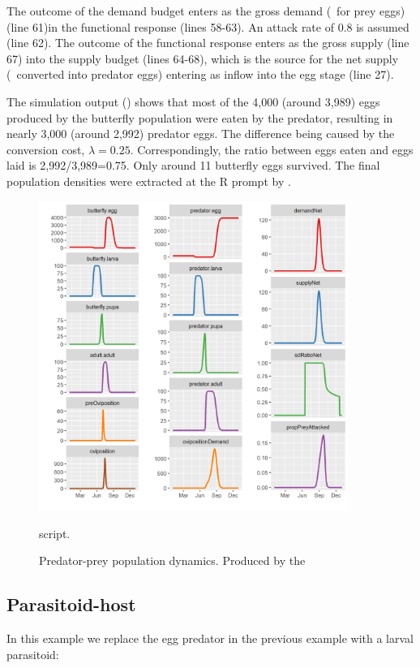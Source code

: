 The outcome of the demand budget enters as the gross demand (\ie\ for prey eggs) (line 61)in the functional response (lines 58-63). An attack rate of 0.8 is assumed (line 62). The outcome of the functional response enters as the gross supply (line 67) into the supply budget (lines 64-68), which is the source for the net supply (\ie\ converted into predator eggs) entering as inflow into the egg stage (line 27).

The simulation output () shows that most of the 4,000 (around 3,989) eggs produced by the butterfly population were eaten by the predator, resulting in nearly 3,000 (around 2,992) predator eggs. The difference being caused by the conversion cost, $\lambda=0.25$. Correspondingly, the ratio between eggs eaten and eggs laid is 2,992/3,989=0.75. Only around 11 butterfly eggs survived. The final population densities were extracted at the R prompt by .

\begin{figure} 
\centering
\includegraphics[width=0.9\textwidth]{graphics/func-resp-pred-prey}
\caption{Predator-prey population dynamics. Produced by the } script.
\label{fig:func-resp-pred-prey}
\end{figure}

\FloatBarrier
\subsection{Parasitoid-host}
\label{ch:trophics-parasitoid-host}
In this example we replace the egg predator in the previous example with a larval parasitoid:

